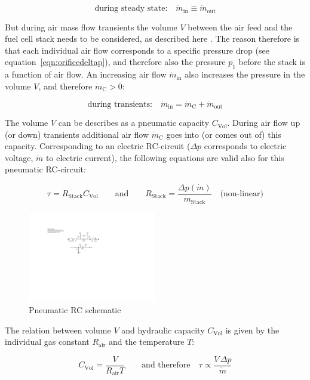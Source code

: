 \documentclass[11pt,a4paper,english,twoside]{scrreprt}
\begin{document}
\[\mbox{during steady state:} \quad \dot m_\mathrm{in} \equiv \dot m_\mathrm{out}\]

But during air mass flow transients the volume $V$ between the air feed and the fuel cell stack needs to be considered, as described here \cite{lit:Danzer}. The reason therefore is that each individual air flow corresponds to a specific pressure drop (see equation~\ref{eqn:orificedeltap}), and therefore also the pressure $p_1$ before the stack is a function of air flow. An increasing air flow $\dot m_\mathrm{in}$ also increases the pressure in the volume $V$, and therefore $\dot m_\mathrm{C} > 0$:

\[\mbox{during transients:} \quad \dot m_\mathrm{in} = \dot m_\mathrm{C} + \dot m_\mathrm{out}\]

The volume $V$ can be describes as a pneumatic capacity $C_\mathrm{Vol}$. During air flow up (or down) transients additional air flow $\dot m_\mathrm{C}$ goes into (or comes out of) this capacity. Corresponding to an electric RC-circuit ($\Delta p$ corresponds to electric voltage, $\dot m$ to electric current), the following equations are valid also for this pneumatic RC-circuit:

\[\tau = R_\mathrm{Stack} C_\mathrm{Vol} \qquad \mbox{and} \qquad R_\mathrm{Stack} = \frac{\Delta p (\dot m)}{\dot m_\mathrm{Stack}} \quad \mbox{(non-linear)}\]

\begin{figure}
  \centering
  \includegraphics*[width=0.5\textwidth,angle=0]{FCF_Figure_Cathode_Dynamics.pdf}
  \caption[Pneumatic RC schematic]{Pneumatic RC schematic}
  \label{fig:Cathode_Dynamics}
\end{figure}

The relation between volume $V$ and hydraulic capacity $C_\mathrm{Vol}$ is given by the individual gas constant $R_\mathrm{air}$ and the temperature $T$:

\[C_\mathrm{Vol} = \frac{V}{R_\mathrm{air} T} \qquad \mbox{and therefore} \quad \tau \propto \frac{V\, \Delta p}{\dot m}\]
\end{document}
